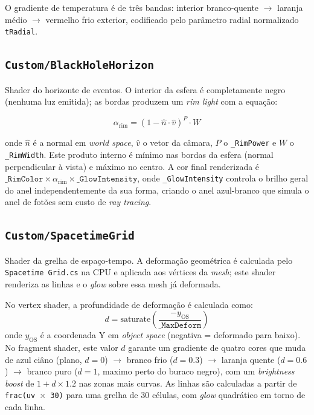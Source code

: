 \documentclass[12pt,a4paper]{article}
\begin{document}
O gradiente de temperatura \'{e} de tr\^{e}s bandas: interior branco-quente $\to$ laranja m\'{e}dio $\to$ vermelho frio exterior, codificado pelo par\^{a}metro radial normalizado \texttt{tRadial}.

\subsection{\texttt{Custom/BlackHoleHorizon}}

Shader do horizonte de eventos. O interior da esfera \'{e} completamente negro (nenhuma luz emitida); as bordas produzem um \textit{rim light} com a equa\c{c}\~{a}o:

\begin{equation}
\alpha_{\text{rim}} = \left(1 - \hat{n} \cdot \hat{v}\right)^{P} \cdot W
\end{equation}

onde $\hat{n}$ \'{e} a normal em \textit{world space}, $\hat{v}$ o vetor da c\^{a}mara, $P$ o \texttt{\_RimPower} e $W$ o \texttt{\_RimWidth}. Este produto interno \'{e} m\'{i}nimo nas bordas da esfera (normal perpendicular \`{a} vista) e m\'{a}ximo no centro. A cor final renderizada \'{e} $\texttt{\_RimColor} \times \alpha_{\text{rim}} \times \texttt{\_GlowIntensity}$, onde \texttt{\_GlowIntensity} controla o brilho geral do anel independentemente da sua forma, criando o anel azul-branco que simula o anel de fot\~{o}es sem custo de \textit{ray tracing}.

\subsection{\texttt{Custom/SpacetimeGrid}}

Shader da grelha de espa\c{c}o-tempo. A deforma\c{c}\~{a}o geom\'{e}trica \'{e} calculada pelo \texttt{Spacetime\ Grid.cs} na CPU e aplicada aos v\'{e}rtices da \textit{mesh}; este shader renderiza as linhas e o \textit{glow} sobre essa mesh j\'{a} deformada.

No vertex shader, a profundidade de deforma\c{c}\~{a}o \'{e} calculada como:
\begin{equation}
d = \text{saturate}\!\left(\frac{-y_{\text{OS}}}{\texttt{\_MaxDeform}}\right)
\end{equation}
onde $y_{\text{OS}}$ \'{e} a coordenada Y em \textit{object space} (negativa = deformado para baixo). No fragment shader, este valor $d$ garante um gradiente de quatro cores que muda de azul ci\^{a}no (plano, $d=0$) $\to$ branco frio ($d=0.3$) $\to$ laranja quente ($d=0.6$) $\to$ branco puro ($d=1$, maximo perto do buraco negro), com um \textit{brightness boost} de $1 + d \times 1.2$ nas zonas mais curvas. As linhas s\~{a}o calculadas a partir de \texttt{frac(uv $\times$ 30)} para uma grelha de 30 c\'{e}lulas, com \textit{glow} quadr\'{a}tico em torno de cada linha.
\end{document}
